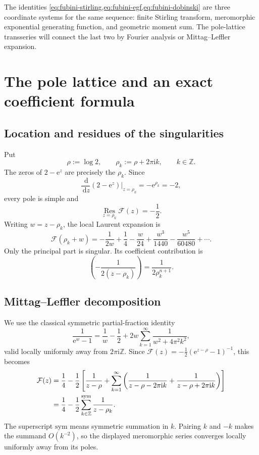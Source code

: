 \documentclass[11pt,oneside]{article}
\numberwithin{equation}{section}
\newcommand{\e}{\mathrm e}
\newcommand{\ii}{\mathrm i}
\newcommand{\dd}{\,\mathrm d}
\newcommand{\Z}{\mathbb Z}
\newcommand{\Res}{\operatorname*{Res}}
\newcommand{\Coeff}[2]{[#1^{#2}]}
\newcommand{\paren}[1]{\left(#1\right)}
\newcommand{\sym}{\mathrm{sym}}
\begin{document}
The identities \cref{eq:fubini-stirling,eq:fubini-egf,eq:fubini-dobinski} are three coordinate systems for the same sequence: finite Stirling transform, meromorphic exponential generating function, and geometric moment sum.  The pole-lattice transseries will connect the last two by Fourier analysis or Mittag--Leffler expansion.

\section{The pole lattice and an exact coefficient formula}
\label{sec:poles}

\subsection{Location and residues of the singularities}

Put
\begin{equation}
 \rho:=\log2,
 \qquad
 \rho_k:=\rho+2\pi\ii k,
 \qquad k\in\Z.
 \label{eq:rho-definitions}
\end{equation}
The zeros of \(2-\e^z\) are precisely the \(\rho_k\).  Since
\[
 \frac{\dd}{\dd z}(2-\e^z)\bigg|_{z=\rho_k}=-\e^{\rho_k}=-2,
\]
every pole is simple and
\begin{equation}
 \Res_{z=\rho_k}\mathcal F(z)=-\frac12.
 \label{eq:residue}
\end{equation}
Writing \(w=z-\rho_k\), the local Laurent expansion is
\begin{equation}
 \mathcal F(\rho_k+w)
 =-\frac{1}{2w}+\frac14-\frac{w}{24}
 +\frac{w^3}{1440}-\frac{w^5}{60480}+\cdots.
 \label{eq:local-laurent}
\end{equation}
Only the principal part is singular.  Its coefficient contribution is
\begin{equation}
 \Coeff{z}{n}\paren{-\frac{1}{2(z-\rho_k)}}
 =\frac{1}{2\rho_k^{n+1}}.
 \label{eq:single-pole-coefficient}
\end{equation}

\subsection{Mittag--Leffler decomposition}

We use the classical symmetric partial-fraction identity
\begin{equation}
 \frac{1}{\e^w-1}
 =\frac1w-\frac12
 +2w\sum_{k=1}^{\infty}\frac{1}{w^2+4\pi^2k^2},
 \label{eq:bernoulli-mittag}
\end{equation}
valid locally uniformly away from \(2\pi\ii\Z\).  Since
\(\mathcal F(z)=-\tfrac12(\e^{z-\rho}-1)^{-1}\), this becomes
\begin{align}
 \mathcal F(z)
 &=\frac14-\frac12\left[
 \frac{1}{z-\rho}
 +\sum_{k=1}^{\infty}
 \left(\frac{1}{z-\rho-2\pi\ii k}
      +\frac{1}{z-\rho+2\pi\ii k}\right)
 \right]
 \notag\\
 &=\frac14-\frac12\sum_{k\in\Z}^{\sym}\frac{1}{z-\rho_k}.
 \label{eq:fubini-mittag}
\end{align}
The superscript \(\sym\) means symmetric summation in \(k\).  Pairing \(k\) and \(-k\) makes the summand \(O(k^{-2})\), so the displayed meromorphic series converges locally uniformly away from its poles.
\end{document}
